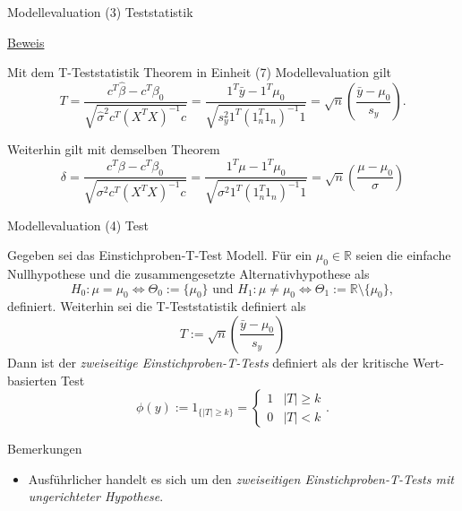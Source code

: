 \documentclass[
  8pt,
  ignorenonframetext,
]{beamer}
\providecommand{\tightlist}{%
  \setlength{\itemsep}{0pt}\setlength{\parskip}{0pt}}
\begin{document}
\begin{frame}{Modellevaluation}
\protect\hypertarget{modellevaluation-5}{}
\noindent (3) Teststatistik

\footnotesize

\underline{Beweis}

Mit dem T-Teststatistik Theorem in Einheit (7) Modellevaluation gilt
\begin{equation}
T
= \frac{c^T \hat{\beta} - c^T \beta_0}{\sqrt{\hat{\sigma}^2 c^T (X^TX)^{-1}c}}
= \frac{1^T \bar{y} - 1^T \mu_0}{\sqrt{s_y^2 1^T (1_n^T1_n)^{-1}1}}
= \sqrt{n}\left(\frac{\bar{y} - \mu_0}{s_y}\right).
\end{equation} \vspace{2mm}

Weiterhin gilt mit demselben Theorem \begin{equation}
\delta
= \frac{c^T \beta - c^T \beta_0}{\sqrt{\sigma^2 c^T (X^TX)^{-1}c}}
= \frac{1^T \mu   - 1^T \mu_0  }{\sqrt{\sigma^2 1^T (1_n^T 1_n)^{-1}1}}
= \sqrt{n}\left(\frac{\mu - \mu_0}{\sigma}\right)
\end{equation}
\end{frame}

\begin{frame}{Modellevaluation}
\protect\hypertarget{modellevaluation-6}{}
\noindent (4) Test

\footnotesize
\begin{definition}
\justifying
Gegeben sei das Einstichproben-T-Test Modell. Für ein $\mu_0 \in \mathbb{R}$ seien
die einfache Nullhypothese und die zusammengesetzte Alternativhypothese als
\begin{equation}
H_0 : \mu = \mu_0 \Leftrightarrow \Theta_0 := \{\mu_0\}
\mbox{ und }
H_1 : \mu \neq \mu_0 \Leftrightarrow \Theta_1 := \mathbb{R} \setminus \{\mu_0\},
\end{equation}
definiert. Weiterhin sei die T-Teststatistik definiert als
\begin{equation}
T := \sqrt{n}\left(\frac{\bar{y} - \mu_0}{s_y}\right)
\end{equation}
Dann ist der \textit{zweiseitige Einstichproben-T-Tests} definiert als der
kritische Wert-basierten Test
\begin{equation}
\phi(y) := 1_{\{|T| \ge k\}} =
{\begin{cases}
1 & |T| \ge k \\
0 & |T|  <  k
\end{cases}}.
\end{equation}
\end{definition}

Bemerkungen

\begin{itemize}
\tightlist
\item
  Ausführlicher handelt es sich um den \emph{zweiseitigen
  Einstichproben-T-Tests mit ungerichteter Hypothese}.
\end{itemize}
\end{frame}
\end{document}
